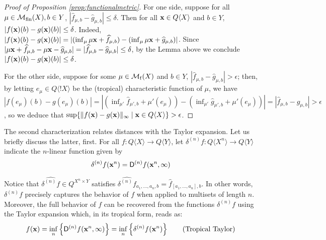 %
%



  
  \begin{proof}[Proof of Proposition \ref{prop:functionalmetric}]
For one side, suppose for all $\mu\in \mathcal{M}_{\mathrm{fin}}(X),b\in Y$, 
$|\widehat f_{\mu,b}-\widehat g_{\mu,b}|\leq \delta$. Then for all $\mathbf{x}\in Q\langle X\rangle$ and $b\in Y$, $|f(\mathbf{x})(b)-g(\mathbf{x})(b)|\leq \delta$.
Indeed, $|f(\mathbf{x})(b)-g(\mathbf{x})(b)|= |( \inf_{\mu}\mu \mathbf{x}+\widehat f_{\mu,b})- (\inf_{\mu}\mu \mathbf{x}+\widehat g_{\mu,b})|$. 
Since $|\mu \mathbf{x}+\widehat f_{\mu,b} - \mu \mathbf{x} -\widehat g_{\mu,b}|= |\widehat f_{\mu,b}-\widehat g_{\mu,b}|\leq \delta$, by the Lemma above we conclude $|f(\mathbf{x})(b)-g(\mathbf{x})(b)|\leq \delta$. 


For the other side, suppose for some $\mu\in \mathcal{M}_{\mathrm f}(X)$ and $b\in Y$, $|\widehat f_{\mu,b}-\widehat g_{\mu,b}|> \epsilon$; 
then, by letting $e_{\mu}\in Q\langle !X\rangle$ be the (tropical) characteristic function of $\mu$, we have
 $|f(e_{\mu})({b})-g(e_{\mu})({b})| =
|( \inf_{\mu'}\widehat f_{\mu',b}+ \mu'(e_{\mu}))-
( \inf_{\mu'}\widehat g_{\mu',b}+\mu'(e_{\mu}))|=
|\widehat f_{\mu,b}- \widehat g_{\mu,b}|> \epsilon$, so we deduce that 
$\sup\{\| f(\mathbf{x})- g(\mathbf{x}) \|_{\infty}\mid \mathbf{x}\in Q\langle X\rangle\}> \epsilon$.
\end{proof}


The second characterization relates distances with the Taylor expansion. Let us briefly discuss the latter, first.
For all $f: Q\langle X\rangle \to Q\langle Y\rangle$, let $\delta^{(n)}f:Q\langle X^{n}\rangle \to Q\langle Y\rangle$ indicate the $n$-linear function given by 
$$
\delta^{(n)}f(\mathbf{x}^{n})=\mathsf D^{(n)}f(\mathbf{x}^{n}, \infty)
$$

Notice that $\widehat{\delta^{(n)}f}\in Q^{X^{n}\times Y}$ satisfies 
$\widehat{\delta^{(n)}f}_{a_{1},\dots, a_{n},b}= \widehat f_{[a_{1},\dots, a_{n}],b}$.
In other words, $\delta^{(n)}f$ precisely captures the behavior of $f$ when applied to multisets of length $n$. Moreover, the full behavior of $f$ can be recovered from the functions $\delta^{(n)}f$ using the Taylor expansion which, in its tropical form, reads as:
\begin{equation}
f(\mathbf{x})= \inf_{n}\left \{\mathsf D^{(n)}f(\mathbf{x}^{n},\infty)\right\}= \inf_{n}\left \{\delta^{(n)}f(\mathbf{x}^{n})\right\}
\tag{Tropical Taylor}
\end{equation}





